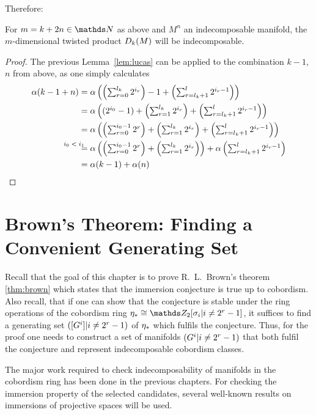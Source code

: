 Therefore:
\begin{Cor}\label{cor:twistedprod:indecompcriterion}
  For $m=k+2n\in\Nat$ as above and $M^n$ an indecomposable manifold,
  the $m$-dimensional twisted product $D_{k}({M})$ will be
  indecomposable.
  \begin{proof}
    The previous Lemma~\ref{lem:lucas} can be applied to the
    combination $k-1$, $n$ from above, as one simply calculates
    \begin{align*}
      \alpha(k-1+n)
      &=\textstyle
        \alpha\left(
        \left(\sum_{r=0}^{l_k} 2^{i_r}\right)
        - 1
        + \left(\sum_{r=l_k+1}^{l} 2^{i_r-1}\right)
        \right) \\
      &=\textstyle
        \alpha\left(
        (2^{i_0}-1)
        + \left(\sum_{r=1}^{l_k} 2^{i_r}\right)
        + \left(\sum_{r=l_k+1}^{l} 2^{i_r-1}\right)
        \right) \\
      &=\textstyle
        \alpha\left(
        \left(\sum_{r=0}^{i_0-1} 2^r \right)
        + \left(\sum_{r=1}^{l_k} 2^{i_r}\right)
        + \left(\sum_{r=l_k+1}^{l} 2^{i_r-1}\right)
        \right) \\
      &\textstyle
        \equalsby{$i_0<i_1$}
        \alpha\left(
        \left(\sum_{r=0}^{i_0-1} 2^r \right)
        + \left(\sum_{r=1}^{l_k} 2^{i_r}\right)
        \right)
        + \alpha\left(\sum_{r=l_k+1}^{l} 2^{i_r-1}\right)
      \\
      &= \alpha(k-1) + \alpha(n)
    \end{align*}
  \end{proof}
\end{Cor}


\section
{Brown's Theorem: Finding a Convenient Generating Set}
\label{sec:proofbrown}
Recall that the goal of this chapter is to prove R.~L.~Brown's
theorem \ref{thm:brown} which states that the immersion conjecture is
true up to cobordism.
Also recall, that if one can show that the conjecture is stable
under the ring operations of the cobordism ring
$\c_*\cong\Zmod2[\sigma_i|i\neq2^r-1]$, it suffices to find a
generating set $([G^{i}]|i\neq2^r-1)$ of $\eta_*$ which fulfils the conjecture.
Thus, for the proof one needs to construct a set of manifolds
$(G^{i}|i\neq2^r-1)$ that both fulfil the conjecture and represent
indecomposable cobordism classes.

The major work required to check indecomposability of manifolds in the
cobordism ring has been done in the previous chapters.
For checking the immersion property of the selected candidates,
several well-known results on immersions of projective spaces
will be used.


